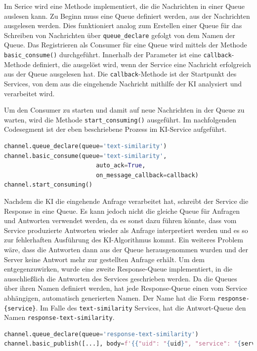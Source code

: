 Im Serice wird eine Methode implementiert, die die Nachrichten in einer Queue auslesen kann. Zu Beginn muss eine Queue definiert werden, aus der Nachrichten ausgelesen werden. Dies funktioniert analog zum Erstellen einer Queue für das Schreiben von Nachrichten über \texttt{queue\_{}declare} gefolgt von dem Namen der Queue. Das Registrieren als Consumer für eine Queue wird mittels der Methode \texttt{basic\_{}consume()} durchgeführt. Innerhalb der Parameter ist eine \texttt{callback}-Methode definiert, die ausgelöst wird, wenn der Service eine Nachricht erfolgreich aus der Queue ausgelesen hat. Die \texttt{callback}-Methode ist der Startpunkt des Services, von dem aus die eingehende Nachricht mithilfe der KI analysiert und verarbeitet wird.

Um den Consumer zu starten und damit auf neue Nachrichten in der Queue zu warten, wird die Methode \texttt{start\_{}consuming()} ausgeführt. Im nachfolgenden Codesegment ist der eben beschriebene Prozess im KI-Service aufgeführt.

\begin{lstlisting}[language=Python, caption={Aufsetzen und Konsumieren der RabbitMQ-Queue im KI-Service}]
channel.queue_declare(queue='text-similarity')
channel.basic_consume(queue='text-similarity',
                          auto_ack=True,
                          on_message_callback=callback)
channel.start_consuming()
\end{lstlisting}

Nachdem die KI die eingehende Anfrage verarbeitet hat, schreibt der Service die Response in eine Queue. Es kann jedoch nicht die gleiche Queue für Anfragen und Antworten verwendet werden, da es sonst dazu führen könnte, dass vom Service produzierte Antworten wieder als Anfrage interpretiert werden und es so zur fehlerhaften Ausführung des KI-Algorithmus kommt. Ein weiteres Problem wäre, dass die Antworten dann aus der Queue herausgenommen wurden und der Server keine Antwort mehr zur gestellten Anfrage erhält. Um dem entgegenzuwirken, wurde eine zweite Response-Queue implementiert, in die ausschließlich die Antworten des Services geschrieben werden. Da die Queues über ihren Namen definiert werden, hat jede Response-Queue einen vom Service abhängigen, automatisch generierten Namen. Der Name hat die Form \texttt{response-\{service\}}. Im Falle des \texttt{text-similarity} Services, hat die Antwort-Queue den Namen \texttt{response-text-similarity}. 

\begin{lstlisting}[language=Python, caption={Senden eines KI-Ergebnisses an das Backend }]
channel.queue_declare(queue='response-text-similarity')
channel.basic_publish([...], body=f'{{"uid": "{uid}", "service": "{service}", "message": {json.dumps(message)}}}'.encode('utf-8'))
\end{lstlisting}

